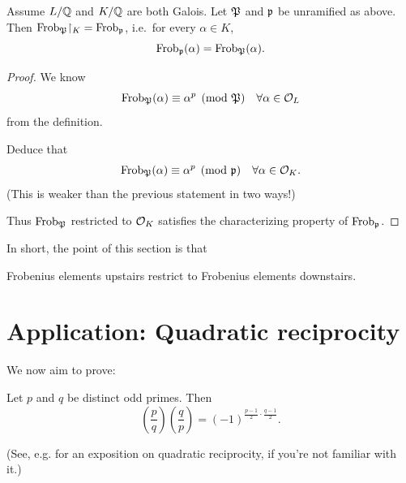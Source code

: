 \begin{theorem}
	Assume $L/\mathbb Q$ and $K/\mathbb Q$ are both Galois.
	Let $\mathfrak P$ and $\mathfrak p$ be unramified as above.
	Then $\Frob_{\kP} \restrict{K} = \Frob_{\pp}$,
	i.e.\ for every $\alpha \in K$,
	\[ \mathrm{Frob}_\mathfrak p(\alpha) = \mathrm{Frob}_{\mathfrak P}(\alpha). \]
\end{theorem}
\begin{proof}
	We know
	\[ \mathrm{Frob}_{\mathfrak P}(\alpha) \equiv \alpha^p \pmod{\mathfrak P}
		\quad \forall \alpha \in \mathcal O_L \]
	from the definition.
	\begin{ques}
		Deduce that
		\[ \mathrm{Frob}_{\mathfrak P}(\alpha) \equiv \alpha^p \pmod{\mathfrak p}
			\quad \forall \alpha \in \mathcal O_K. \]
		(This is weaker than the previous statement in two ways!)
	\end{ques}
	Thus $\mathrm{Frob}_{\mathfrak P}$ restricted to $\mathcal O_K$ satisfies the
	characterizing property of $\mathrm{Frob}_\mathfrak p$.
\end{proof}
In short, the point of this section is that
\begin{moral}
	Frobenius elements upstairs restrict to Frobenius elements downstairs.
\end{moral}

\section{Application: Quadratic reciprocity}
We now aim to prove:
\begin{theorem}
	Let $p$ and $q$ be distinct odd primes.
	Then
	\[ \left( \frac pq \right)\left( \frac qp \right)
		= (-1)^{\frac{p-1}{2} \cdot \frac{q-1}{2}}. \]
\end{theorem}
(See, e.g. \cite{ref:holden} for an exposition on quadratic reciprocity,
if you're not familiar with it.)

